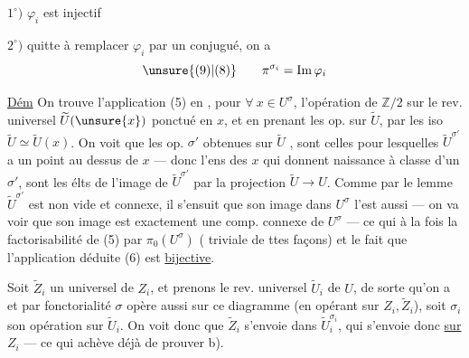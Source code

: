 $1^\circ)$ $\varphi_i$ est injectif

$2^\circ)$ quitte à remplacer $\varphi_i$ par un conjugué,
on a
\[
\unsure{(9)|(8)}\qquad \pi^{\sigma_i}=\operatorname{Im}\varphi_i
\]

\uline{Dém} On trouve l'application (5) en
, pour $\forall\ x\in U^\sigma$, l'opération  de
$\mathbb Z/2$ sur le rev. universel $\widetilde U(\unsure{x})$ ponctué
en $x$, et en  prenant les
op.  sur $\widetilde U$,  par
les iso $\widetilde U\simeq\widetilde U(x)$. On voit que
les  op. $\sigma'$ obtenues sur $\widetilde U$ , sont
celles pour lesquelles  $\widetilde U^{\sigma'}$ a un
point au dessus de $x$ --- donc l'ens
des $x$ qui donnent naissance à 
classe d'un $\sigma'$, sont les élts de
l'image de $\widetilde U^{\sigma'}$ par la projection
$\widetilde U\longrightarrow U$. Comme par le lemme $\widetilde U^{\sigma'}$
est non vide et connexe, il s'ensuit que
son image dans $U^\sigma$ l'est aussi --- on va
voir que son image est exactement une comp.
connexe de $U^\sigma$ --- ce qui à la fois 
la factorisabilité de (5) par  $\pi_0(U^\sigma)$
( triviale de ttes façons) et le fait que
l'application déduite (6) est \uline{bijective}.

Soit $\widetilde Z_i$ un  universel de $Z_i$,
et prenons le rev. universel 
$\widetilde U_i$ de $U$, de sorte qu'on a
et par fonctorialité $\sigma$ opère aussi sur ce
diagramme (en opérant  sur $Z_i,\widetilde Z_i$),
soit $\sigma_i$ son opération sur $\widetilde U_i$. On
voit donc que $\widetilde Z_i$ s'envoie dans $\widetilde U_i^{\sigma_i}$,
qui s'envoie donc \uline{sur} $Z_i$ --- ce qui achève
déjà de prouver b).

